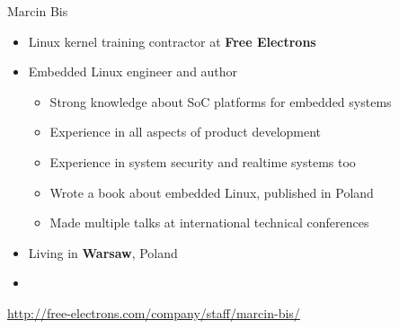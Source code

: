 \begin{frame}{Marcin Bis}
    \begin{itemize}
      \item Linux kernel training contractor at {\bf Free Electrons}
      \item Embedded Linux engineer and author
        \begin{itemize}
	  \item Strong knowledge about SoC platforms for embedded systems
	  \item Experience in all aspects of product development
	  \item Experience in system security and realtime systems too
	  \item Wrote a book about embedded Linux, published in Poland
	  \item Made multiple talks at international technical conferences
        \end{itemize}
      \item Living in {\bf Warsaw}, Poland
      \item {}
    \end{itemize}
    {\small \url{http://free-electrons.com/company/staff/marcin-bis/}}
\end{frame}

